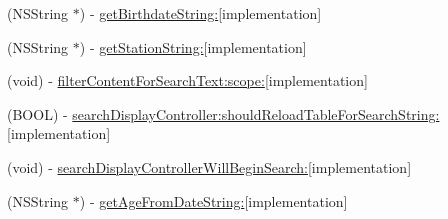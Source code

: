 \begin{DoxyCompactItemize}
(N\+S\+String $\ast$) -\/ \hyperlink{interface_verordnungen_view_controller_ab4efe19d78a01e4932e86e0a0e1eba81}{get\+Birthdate\+String\+:}{\ttfamily  \mbox{[}implementation\mbox{]}}
\item 
(N\+S\+String $\ast$) -\/ \hyperlink{interface_verordnungen_view_controller_a61c216b91ea00491470d74edb2e49b4a}{get\+Station\+String\+:}{\ttfamily  \mbox{[}implementation\mbox{]}}
\item 
(void) -\/ \hyperlink{interface_verordnungen_view_controller_ade70be8f791c5b12f486f56fddde80db}{filter\+Content\+For\+Search\+Text\+:scope\+:}{\ttfamily  \mbox{[}implementation\mbox{]}}
\item 
(B\+O\+O\+L) -\/ \hyperlink{interface_verordnungen_view_controller_a21166fd9f608ff26819bcb0025ac2e0c}{search\+Display\+Controller\+:should\+Reload\+Table\+For\+Search\+String\+:}{\ttfamily  \mbox{[}implementation\mbox{]}}
\item 
(void) -\/ \hyperlink{interface_verordnungen_view_controller_a07d4e0defec451e82f3742165b22d8da}{search\+Display\+Controller\+Will\+Begin\+Search\+:}{\ttfamily  \mbox{[}implementation\mbox{]}}
\item 
(N\+S\+String $\ast$) -\/ \hyperlink{interface_verordnungen_view_controller_ac889a83817d63664fda92c880541beef}{get\+Age\+From\+Date\+String\+:}{\ttfamily  \mbox{[}implementation\mbox{]}}
\end{DoxyCompactItemize}
